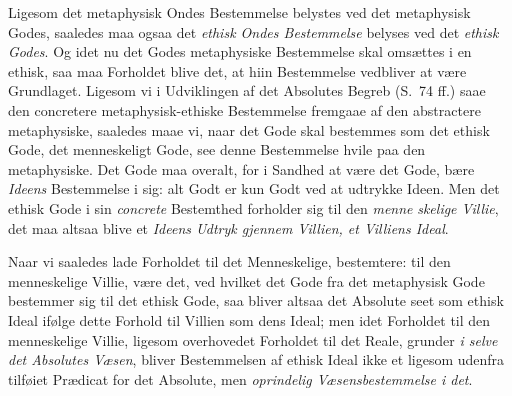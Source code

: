 Ligesom det metaphysisk Ondes Bestemmelse belystes ved det metaphysisk Godes,
saaledes maa ogsaa det \emph{ethisk Ondes Bestemmelse} belyses ved det
\emph{ethisk Godes}. Og idet nu det Godes metaphysiske Bestemmelse skal omsættes
i en ethisk, saa maa Forholdet blive det, at hiin Bestemmelse vedbliver at være
Grundlaget. Ligesom vi i Udviklingen af det Absolutes Begreb (S.\ 74 ff.) saae
den concretere metaphysisk-ethiske Bestemmelse fremgaae af den abstractere
metaphysiske, saaledes maae vi, naar det Gode skal bestemmes som det ethisk
Gode, det menneskeligt Gode, see denne Bestemmelse hvile paa den metaphysiske.
Det Gode maa overalt, for i Sandhed at være det Gode, bære \emph{Ideens}
Bestemmelse i sig: alt Godt er kun Godt ved at udtrykke Ideen. Men det ethisk
Gode i sin \emph{concrete} Bestemthed forholder sig til den \emph{menne}\-%
\emph{skelige Villie}, det maa altsaa blive et \emph{Ideens Udtryk gjennem
Villien, et Villiens Ideal}.

Naar vi saaledes lade Forholdet til det Menneskelige, bestemtere: til den
menneskelige Villie, være det, ved hvilket det Gode fra det metaphysisk Gode
bestemmer sig til det ethisk Gode, saa bliver altsaa det Absolute seet som
ethisk Ideal ifølge dette Forhold til Villien som dens Ideal; men idet Forholdet
til den menneskelige Villie, ligesom overhovedet Forholdet til det Reale,
grunder \emph{i selve det Absolutes Væsen}, bliver Bestemmelsen af ethisk Ideal
ikke et ligesom udenfra tilføiet Prædicat for det Absolute, men \emph{oprindelig
Væsensbestemmelse i det}.

